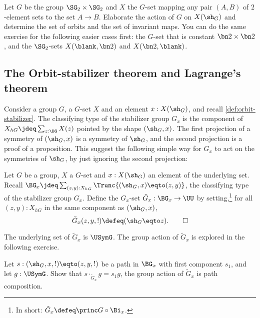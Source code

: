 \begin{xca}\label{xca:Gset-A->B}
Let $G$ be the group $\SG_2\times\SG_2$ and $X$ the $G$-set mapping
any pair $(A,B)$ of $2$-element sets to the set $A\to B$.
Elaborate the action of $G$ on $X(\sh_G)$ and determine the
set of orbits and the set of invariant maps. You can
do the same exercise for the following easier cases first:
the $G$-set that is constant $\bn2\times\bn2$, and
the $\SG_2$-sets $X(\blank,\bn2)$ and $X(\bn2,\blank)$.
\end{xca}

\subsection{The Orbit-stabilizer theorem and Lagrange's theorem}

Consider a group $G$, a $G$-set $X$ and an element $x:X(\sh_G)$,
and recall \cref{def:orbit-stabilizer}.
The classifying type of the stabilizer group $G_x$
is the component of $X_{hG}\jdeq\sum_{z:\BG} X(z)$ 
pointed by the shape $(\sh_G,x)$.
The first projection of a symmetry of $(\sh_G,x)$ is a symmetry of 
$\sh_G$, and the second projection is a proof of a proposition.
This suggest the following simple way for $G_x$ to act on the
symmetries of $\sh_G$, by just ignoring the second projection:


\begin{definition}\label{def:Gx-action-on-G}
Let $G$ be a group, $X$ a $G$-set and $x:X(\sh_G)$ an element of 
the underlying set. Recall 
$\BG_x \jdeq \sum_{(z,y):X_{hG}}\Trunc{(\sh_G,x)\eqto(z,y)}$,
the classifying type of the stabilizer group $G_x$. 
Define the $G_x$-set $\tilde G_x : \BG_x \to \UU$ by setting,\footnote{%
In short: $\tilde G_x \defeq \princ G \circ \Bi_x$.\label{ft:restriction}}
for all $(z,y):X_{hG}$ in the same component as $(\sh_G,x)$, 
\[
\tilde G_x(z,y,!)\defeq(\sh_G\eqto z).\qedhere
\]

\end{definition} 

The underlying set of $\tilde G_x$ is $\USymG$. The group action of
$\tilde G_x$ is explored in the following exercise.

\begin{xca}\label{xca:Gx-action-on-G}
Let $s:(\sh_G,x,!)\eqto(z,y,!)$ be a path in $\BG_x$ with first component
$s_1$, and let $g:\USymG$. Show that $s\cdot_{\tilde G_x} g = s_1 g$, \ie
the group action of $\tilde G_x$ is path composition. 
\end{xca}

